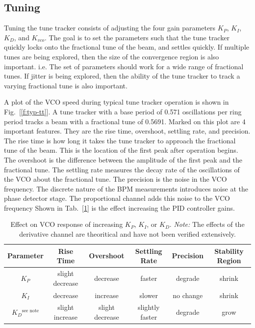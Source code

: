 \subsection{Tuning \label{Tuning}} Tuning the tune tracker consists of
adjusting the four gain parameters $K_P$, $K_I$, $K_D$, and $K_{vco}$.
The goal is to set the parameters such that the tune tracker quickly
locks onto the fractional tune of the beam, and settles quickly.  If
multiple tunes are being explored, then the size of the convergence
region is also important.  i.e.  The set of parameters should work for
a wide range of fractional tunes.  If jitter is being explored, then
the ability of the tune tracker to track a varying fractional tune is
also important.

A plot of the VCO speed during typical tune tracker operation is shown
in Fig.~[\ref{f:typ-tt}].  A tune tracker with a base period of 0.571
oscillations per ring period tracks a beam with a fractional tune of
0.5691.  Marked on this plot are 4 important features.  They are the
rise time, overshoot, settling rate, and precision.  The rise time is
how long it takes the tune tracker to approach the fractional tune of
the beam.  This is the location of the first peak after operation
begins.  The overshoot is the difference between the amplitude of the
first peak and the fractional tune.  The settling rate measures the
decay rate of the oscillations of the VCO about the fractional tune.
The precision is the noise in the VCO frequency.  The discrete nature
of the BPM measurements introduces noise at the phase detector stage.
The proportional channel adds this noise to the VCO frequency Shown in
Tab.~[\ref{t:pid-params}] is the effect increasing the PID controller
gains.

\begin{table}
\begin{tabular}{|c|ccccc|}
\hline
Parameter&  Rise Time&        Overshoot&        Settling Rate&      Precision&  Stability Region\\
\hline
$K_P$&      slight decrease&  decrease&         faster&             degrade&    shrink\\
$K_I$&      decrease&         increase&         slower&             no change&  shrink\\
$K_D$$^\textrm{see note}$&    slight increase&  slight decrease&  slightly faster&    degrade&    grow\\ 
\hline
\end{tabular}
\caption{
Effect on VCO response of increasing $K_P$, $K_I$, or $K_D$. 
{\it Note:} The effects of the derivative channel are theoritical and have not 
been verified extensively.}
\label{t:pid-params}
\end{table}

